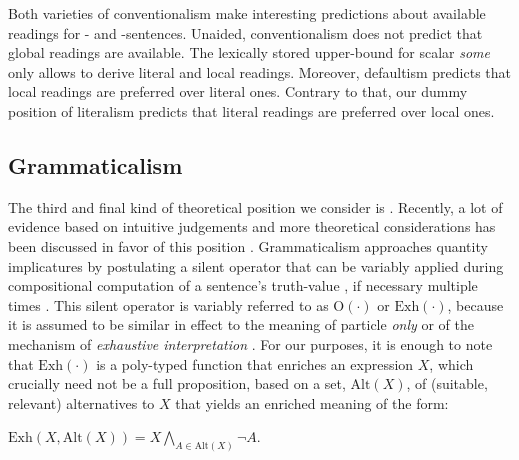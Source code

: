 \documentclass[fleqn,reqno,10pt,draft]{article}
\newcommand{\as}{\acro{as}}
\renewcommand{\es}{\acro{es}}
\newcommand{\exh}{\ensuremath{\mathrm{Exh}}}
\newcommand{\alt}{\ensuremath{\mathrm{Alt}}}
\begin{document}
Both varieties of conventionalism make interesting predictions about
available readings for \as- and \es-sentences. Unaided,
conventionalism does not predict that global readings are
available. The lexically stored upper-bound for scalar \emph{some}
only allows to derive literal and local readings. Moreover, defaultism
predicts that local readings are preferred over literal ones. Contrary
to that, our dummy position of literalism predicts that literal
readings are preferred over local ones.

\subsection{Grammaticalism}
\label{sec:grammaticalism}

The third and final kind of theoretical position we consider is
. Recently, a lot of evidence based on
intuitive judgements and more theoretical considerations has been
discussed in favor of this position
\citep[c.f.][]{Chierchia2006:Broaden-Your-Vi,Fox2007:Free-Choice-and,Magri2011:Another-Argumen,Sauerland2012:The-Computation,ChierchiaFox2008:The-Grammatical,Chierchia2012:FC-Nominals-and}. %
Grammaticalism approaches quantity implicatures by postulating a
silent operator that can be variably applied during compositional
computation of a sentence's truth-value
\citep{Chierchia2006:Broaden-Your-Vi}, if necessary multiple times
\citep{Fox2007:Free-Choice-and}. This silent operator is variably
referred to as $\mathrm{O}(\cdot)$ or $\exh(\cdot)$, because it is
assumed to be similar in effect to the meaning of particle \emph{only}
or of the mechanism of \emph{exhaustive interpretation}
\citep{GroenendijkStokhofThesis1984,Stechowvon-StechowZimmermann1984:Term-Answers-an,Rooijvan-RooijSchulz2013:Exhaustive-Inte,vanRooijSchulz:ExhaustiveInterpretation,Fox2007:Free-Choice-and}. For
our purposes, it is enough to note that $\exh(\cdot)$ is a
poly-typed function that enriches an expression $X$, which crucially
need not be a full proposition, based on a set, $\alt(X)$, of
(suitable, relevant) alternatives to $X$ that yields an enriched
meaning of the form:
\begin{exe}
  \ex \label{bsp:Exh-Def} $\exh(X,\alt(X)) = X \bigwedge_{A \in
      \alt(X)} \neg A$.
\end{exe}
\end{document}
